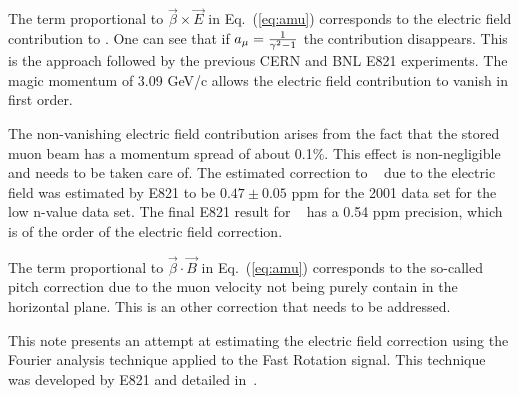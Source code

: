 The term proportional to ${\vec \beta \times \vec E }$ in Eq.~(\ref{eq:amu}) corresponds to the electric field contribution to \wa.
One can see that if $a_{\mu} = {1 \over \gamma^2 - 1}$ the contribution disappears. 
This is the approach followed by the previous CERN and BNL E821 experiments. 
The magic momentum of 3.09 GeV/c allows the electric field contribution to vanish in first order.

The non-vanishing electric field contribution arises from the fact that the stored muon beam has a momentum spread of about 0.1\%.
This effect is non-negligible and needs to be taken care of. The estimated correction to \wa~ due to the electric field was estimated
by E821 to be $0.47 \pm 0.05$ ppm for the 2001 data set for the low n-value data set. The final E821 result for \amu~ has a 0.54 ppm precision, which
is of the order of the electric field correction.

The term proportional to $\vec \beta \cdot \vec B$ in Eq.~(\ref{eq:amu}) corresponds to the so-called pitch correction due to the muon velocity not
being purely contain in the horizontal plane. This is an other correction that needs to be addressed.

This note presents an attempt at estimating the electric field correction using the Fourier analysis technique applied to the Fast Rotation signal. 
This technique was developed by E821 and detailed in~\cite{orlov}.
